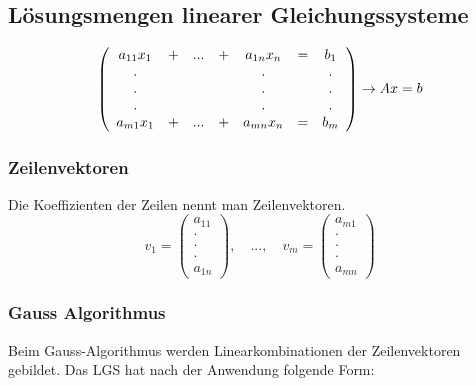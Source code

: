 \documentclass[12pt,a4paper]{article}%
\numberwithin{equation}{section}
\def\vecT#1{\left(\begin{array}{c} #1 \end{array}\right)}
\def\dddot{\cdot \\ \cdot \\ \cdot}
\def\vecDt#1#2{\vecT{#1 \\ \dddot \\ #2}}
\numberwithin{equation}{subsection}
\begin{document}
	    \subsection{Lösungsmengen linearer Gleichungssysteme}
	    \begin{align}
		    \left(
	      \begin{array}{c c c c c c c}
	      a_{11}x_1 & + &  ...   & + & a_{1n}x_n & =  & b_1\\
	      .         & \;& \;     & \;& .         & \; & . \\
	      .         & \;& \;     & \;& .         & \; & . \\
	      .         & \;& \;     & \;& .         & \; & . \\
	      a_{m1}x_1 & + & ...    & + & a_{mn}x_n & =  & b_m\\
	      \end{array}
	    \right) \rightarrow Ax = b   
	   \end{align} 
	   
	   \subsubsection{Zeilenvektoren}
	   Die Koeffizienten der Zeilen nennt man Zeilenvektoren.
	   \begin{equation}
	     v_1 = \vecDt{a_{11}}{a_{1n}}, \quad ..., \quad v_m = \vecDt{a_{m1}}{a_{mn}}
	   \end{equation}
	   
	   \subsubsection{Gauss Algorithmus}
	   Beim Gauss-Algorithmus werden Linearkombinationen der Zeilenvektoren gebildet. Das LGS hat nach der Anwendung folgende Form:
	   
\end{document}
